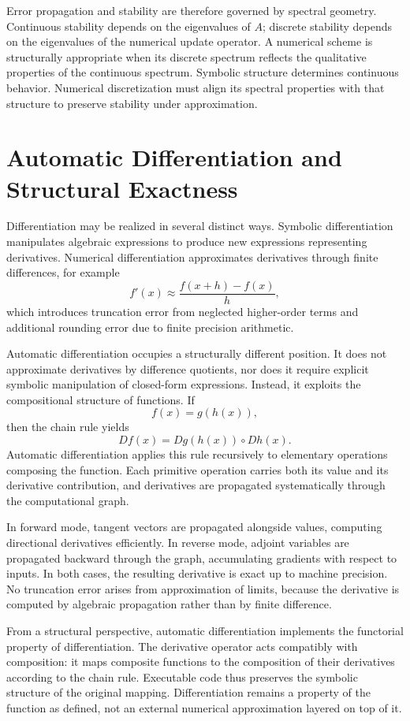 \documentclass[12pt]{book}
\begin{document}
Error propagation and stability are therefore governed by spectral
geometry. Continuous stability depends on the eigenvalues of $A$;
discrete stability depends on the eigenvalues of the numerical update
operator. A numerical scheme is structurally appropriate when its
discrete spectrum reflects the qualitative properties of the
continuous spectrum. Symbolic structure determines continuous behavior.
Numerical discretization must align its spectral properties with that
structure to preserve stability under approximation.

\section{Automatic Differentiation and Structural Exactness}

Differentiation may be realized in several distinct ways. Symbolic
differentiation manipulates algebraic expressions to produce new
expressions representing derivatives. Numerical differentiation
approximates derivatives through finite differences, for example
\[
f'(x) \approx \frac{f(x+h) - f(x)}{h},
\]
which introduces truncation error from neglected higher-order terms
and additional rounding error due to finite precision arithmetic.

Automatic differentiation occupies a structurally different position.
It does not approximate derivatives by difference quotients, nor does
it require explicit symbolic manipulation of closed-form expressions.
Instead, it exploits the compositional structure of functions. If
\[
f(x) = g(h(x)),
\]
then the chain rule yields
\[
Df(x) = Dg(h(x)) \circ Dh(x).
\]
Automatic differentiation applies this rule recursively to elementary
operations composing the function. Each primitive operation carries
both its value and its derivative contribution, and derivatives are
propagated systematically through the computational graph.

In forward mode, tangent vectors are propagated alongside values,
computing directional derivatives efficiently. In reverse mode,
adjoint variables are propagated backward through the graph,
accumulating gradients with respect to inputs. In both cases, the
resulting derivative is exact up to machine precision. No truncation
error arises from approximation of limits, because the derivative is
computed by algebraic propagation rather than by finite difference.

From a structural perspective, automatic differentiation implements
the functorial property of differentiation. The derivative operator
acts compatibly with composition: it maps composite functions to the
composition of their derivatives according to the chain rule.
Executable code thus preserves the symbolic structure of the original
mapping. Differentiation remains a property of the function as defined,
not an external numerical approximation layered on top of it.
\end{document}
